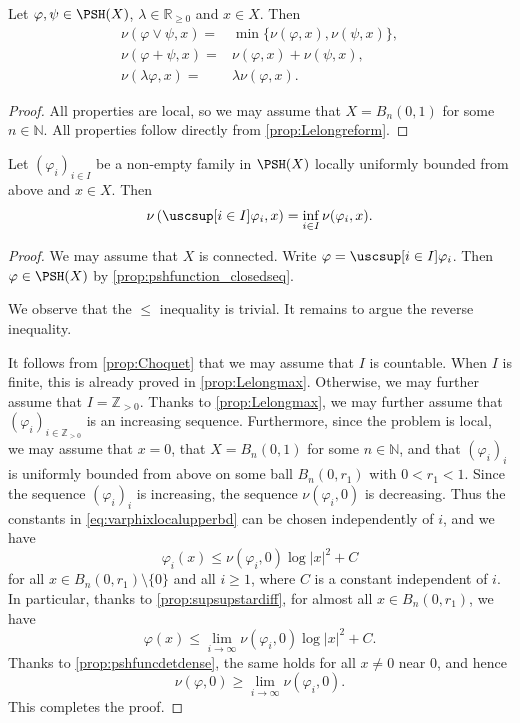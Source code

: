 \begin{proposition}\label{prop:Lelongmax}
    Let $\varphi,\psi\in \PSH(X)$, $\lambda\in \mathbb{R}_{\geq 0}$ and $x\in X$. Then
    \[
        \begin{aligned}
        \nu(\varphi\lor \psi,x)=&\min\{\nu(\varphi,x),\nu(\psi,x)\},\\
        \nu(\varphi+\psi,x)=&\nu(\varphi,x)+\nu(\psi,x),\\
        \nu(\lambda\varphi,x)=&\lambda\nu(\varphi,x).
        \end{aligned}
    \]
\end{proposition}
\begin{proof}
    All properties are local, so we may assume that $X=B_n(0,1)$ for some $n\in \mathbb{N}$. All properties follow directly from \cref{prop:Lelongreform}.
\end{proof}

\begin{corollary}\label{cor:supsLelong}
    Let $(\varphi_i)_{i\in I}$ be a non-empty family in $\PSH(X)$ locally uniformly bounded from above and $x\in X$. Then
    \[
    \nu\left(\uscsup[i\in I]\varphi_i,x\right)=\inf_{i\in I}\nu(\varphi_i,x).
    \]
\end{corollary}
\begin{proof}
    We may assume that $X$ is connected. Write $\varphi=\uscsup[i\in I] \varphi_i$. Then $\varphi\in \PSH(X)$ by \cref{prop:pshfunction_closedseq}.

    We observe that the $\leq$ inequality is trivial. It remains to argue the reverse inequality.

    It follows from \cref{prop:Choquet} that we may assume that $I$ is countable. When $I$ is finite, this is already proved in \cref{prop:Lelongmax}. Otherwise, we may further assume that $I=\mathbb{Z}_{>0}$. Thanks to \cref{prop:Lelongmax}, we may further assume that $(\varphi_i)_{i\in \mathbb{Z}_{>0}}$ is an increasing sequence.
    Furthermore, since the problem is local, we may assume that $x=0$, that $X=B_n(0,1)$ for some $n\in \mathbb{N}$, and that $(\varphi_i)_i$ is uniformly bounded from above on some ball $B_n(0,r_1)$ with $0<r_1<1$. Since the sequence $(\varphi_i)_i$ is increasing, the sequence $\nu(\varphi_i,0)$ is decreasing. Thus the constants in \eqref{eq:varphixlocalupperbd} can be chosen independently of $i$, and we have
    \[
    \varphi_i(x)\leq \nu(\varphi_i,0)\log |x|^2+C
    \]
    for all $x\in B_n(0,r_1)\setminus \{0\}$ and all $i\geq 1$, where $C$ is a constant independent of $i$. In particular, thanks to \cref{prop:supsupstardiff}, for almost all $x\in B_n(0,r_1)$, we have
    \[
    \varphi(x)\leq \lim_{i\to\infty}\nu(\varphi_i,0)\log |x|^2+C.
    \]
    Thanks to \cref{prop:pshfuncdetdense}, the same holds for all $x\neq 0$ near $0$, and hence
    \[
    \nu(\varphi,0)\geq \lim_{i\to \infty} \nu(\varphi_i,0).
    \]
    This completes the proof.
\end{proof}


